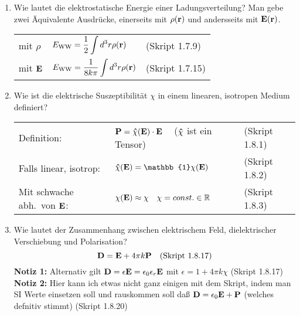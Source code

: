 \documentclass{scrartcl}
\newcommand{\ds}{\displaystyle}
\begin{document}
\begin{enumerate}
    \item Wie lautet die elektrostatische Energie einer Ladungsverteilung?
          Man gebe zwei Äquivalente Ausdrücke, einerseits mit $\rho(\vb r)$
          und andersseits mit $\vb E(\vb r)$.
          \begin{center}
          \begin{tabular}{lll}
            mit $\rho$    & $\ds E_{\text{WW}}=
                            \frac{1}{2}\int d^3 r\rho(\vb r)$
                              &(Skript 1.7.9)\\
            mit $\vb E$   & $\ds E_{\text{WW}}=\frac{1}{8k\pi}
                            \int d^3 r\rho(\vb r)$
                              &(Skript 1.7.15)\\
          \end{tabular}
          \end{center}

    \clearpage
    \item Wie ist die elektrische Suszeptibilität $\chi$ in einem 
          linearen, isotropen Medium definiert?
          \begin{center}
          \begin{tabular}{lll}
            Definition:             & $\ds\vb P = 
                                      \vu \chi(\vb E)\cdot \vb E\quad$
                                      ($\vu\chi$ ist ein Tensor)
                                      & (Skript 1.8.1) \\
            Falls linear, isotrop: 
                                    & $\ds\vu\chi(\vb E)=
                                         \mathbb{1}\chi(\vb E)$
                                      & (Skript 1.8.2) \\
            Mit schwache abh.\ von $\vb E$:
                                    & $\chi(\vb E)\approx\chi
                                       \quad\chi=const.\in\mathbb{R}$
                                      & (Skript 1.8.3) \\
            
          \end{tabular}
          \end{center}

    \item Wie lautet der Zusammenhang zwischen elektrischem Feld, 
          dielektrischer Verschiebung und Polarisation?
          $$\vb D = \vb E + 4\pi k\vb P \quad\text{(Skript 1.8.17)}$$
          \textbf{Notiz 1:} Alternativ gilt $\vb D=\epsilon \vb E
          =\epsilon_0\epsilon_r \vb E$ mit
          $\epsilon=1+4\pi k\chi$
          (Skript 1.8.17)\\
          \textbf{Notiz 2:} Hier kann ich etwas nicht ganz einigen mit
          dem Skript, indem man SI Werte einsetzen soll und rauskommen soll
          daß $\vb D=\epsilon_0 \vb E+\vb P$ (welches defnitiv stimmt)
          (Skript 1.8.20)


\end{enumerate}
\end{document}
